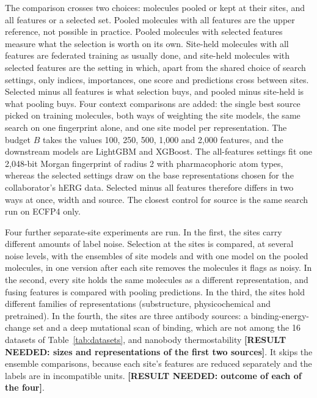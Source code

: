 The comparison crosses two choices: molecules pooled or kept at their sites, and all features or a selected set. Pooled molecules with all features are the upper reference, not possible in practice. Pooled molecules with selected features measure what the selection is worth on its own. Site-held molecules with all features are federated training as usually done, and site-held molecules with selected features are the setting in which, apart from the shared choice of search settings, only indices, importances, one score and predictions cross between sites. Selected minus all features is what selection buys, and pooled minus site-held is what pooling buys. Four context comparisons are added: the single best source picked on training molecules, both ways of weighting the site models, the same search on one fingerprint alone, and one site model per representation. %
The budget $B$ takes the values 100, 250, 500, 1,000 and 2,000 features, and the downstream models are LightGBM and XGBoost. The all-features settings fit one 2,048-bit Morgan fingerprint of radius 2 with pharmacophoric atom types, whereas the selected settings draw on the base representations chosen for the collaborator's hERG data. Selected minus all features therefore differs in two ways at once, width and source. The closest control for source is the same search run on ECFP4 only.

Four further separate-site experiments are run. In the first, the sites carry different amounts of label noise. Selection at the sites is compared, at several noise levels, with the ensembles of site models and with one model on the pooled molecules, in one version after each site removes the molecules it flags as noisy. In the second, every site holds the same molecules as a different representation, and fusing features is compared with pooling predictions. In the third, the sites hold different families of representations (substructure, physicochemical and pretrained). %
In the fourth, the sites are three antibody sources: a binding-energy-change set and a deep mutational scan of binding, which are not among the 16 datasets of Table~\ref{tab:datasets}, and nanobody thermostability \textbf{[RESULT NEEDED: sizes and representations of the first two sources]}. It skips the ensemble comparisons, because each site's features are reduced separately and the labels are in incompatible units. \textbf{[RESULT NEEDED: outcome of each of the four]}.

